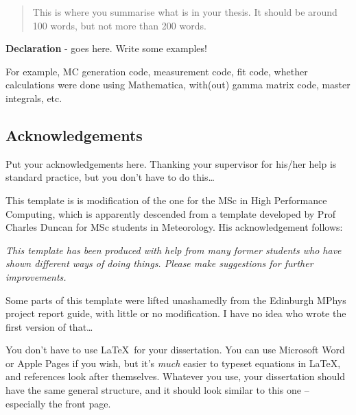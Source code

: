 \documentclass[12pt,a4paper]{report}
\begin{document}
\newpage



\begin{abstract}
This is where you summarise what is in your thesis. It should
be around 100 words, but not more than 200 words.
\end{abstract}



\textbf{Declaration} - goes here. Write some examples!

For example, MC generation code, measurement code, fit code, whether
calculations were done using Mathematica, with(out) gamma matrix code,
master integrals, etc.

\newpage

\tableofcontents
\listoftables
\listoffigures

\begin{titlepage}
\vspace*{2in}
\section*{Acknowledgements}

Put your acknowledgements here. Thanking your supervisor for his/her
help is standard practice, but you don't have to do this\ldots

This template is is modification of the one for the MSc in High
Performance Computing, which is apparently descended from a template
developed by Prof Charles Duncan for MSc students in Meteorology. His
acknowledgement follows:

\emph{This template has been produced with help from many former
  students who have shown different ways of doing things. Please make
  suggestions for further improvements.}

Some parts of this template were lifted unashamedly from the Edinburgh
MPhys project report guide, with little or no modification. I have no
idea who wrote the first version of that\ldots

You don't have to use \LaTeX\ for your dissertation. You can use
Microsoft Word or Apple Pages if you wish, but it's \emph{much} easier
to typeset equations in \LaTeX, and references look after
themselves. Whatever you use, your dissertation should have the same
general structure, and it should look similar to this one --
especially the front page.


\end{titlepage}
\end{document}
